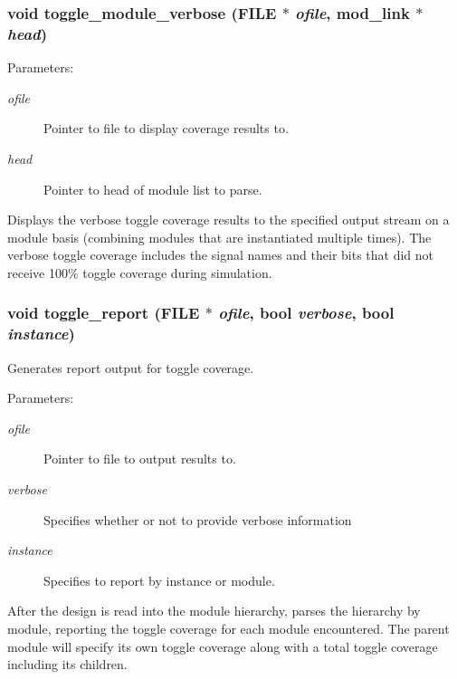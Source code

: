 \subsubsection{\setlength{\rightskip}{0pt plus 5cm}void toggle\_\-module\_\-verbose (FILE $\ast$ {\em ofile}, {\bf mod\_\-link} $\ast$ {\em head})}\label{toggle_8c_a8}


\begin{Desc}
\item[Parameters: ]\par
\begin{description}
\item[{\em 
ofile}]Pointer to file to display coverage results to. \item[{\em 
head}]Pointer to head of module list to parse.\end{description}
\end{Desc}
Displays the verbose toggle coverage results to the specified output stream on a module basis (combining modules that are instantiated multiple times). The verbose toggle coverage includes the signal names and their bits that did not receive 100\% toggle coverage during simulation. 
\subsubsection{\setlength{\rightskip}{0pt plus 5cm}void toggle\_\-report (FILE $\ast$ {\em ofile}, {\bf bool} {\em verbose}, {\bf bool} {\em instance})}\label{toggle_8c_a9}


Generates report output for toggle coverage.

\begin{Desc}
\item[Parameters: ]\par
\begin{description}
\item[{\em 
ofile}]Pointer to file to output results to. \item[{\em 
verbose}]Specifies whether or not to provide verbose information \item[{\em 
instance}]Specifies to report by instance or module.\end{description}
\end{Desc}
After the design is read into the module hierarchy, parses the hierarchy by module, reporting the toggle coverage for each module encountered. The parent module will specify its own toggle coverage along with a total toggle coverage including its  children. 

